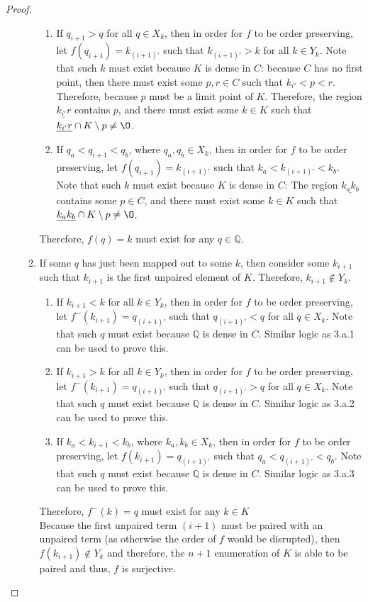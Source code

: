 \documentclass[openany, amssymb, psamsfonts]{amsart}
\newcommand{\bbQ}{\mathbb{Q}}
\renewcommand{\emptyset}{\O}
\newcommand{\sm}{\setminus}
\theoremstyle{definition}
\numberwithin{equation}{section}
\begin{document}
\begin{proof}
\begin{enumerate}
\begin{enumerate}
\begin{enumerate}
    \item If $q_{i+1}>q$ for all $q\in X_k$, then in order for $f$ to be order preserving, let $f(q_{i+1}) = k_{(i+1)'}$ such that $k_{(i+1)'} > k$ for all $k\in Y_k$. Note that such $k$ must exist because $K$ is dense in $C$: because $C$ has no first point, then there must exist some $p,r\in C$ such that $k_{i'}<p<r$. Therefore, because $p$ must be a limit point of $K$. Therefore, the region $\underline{k_{i'}r}$ contains $p$, and there must exist some $k\in K$ such that $\underline{k_{i'}r} \cap K\sm{p} \neq \emptyset$.
    \item If $q_a<q_{i+1}<q_b$, where $q_a,q_b\in X_k$, then in order for $f$ to be order preserving, let $f(q_{i+1}) = k_{(i+1)'}$ such that $k_a<k_{(i+1)'} <k_b$. Note that such $k$ must exist because $K$ is dense in $C$: The region $\underline{k_ak_b}$ contains some $p\in C$, and there must exist some $k\in K$ such that $\underline{k_ak_b} \cap K\sm{p} \neq \emptyset$.
    \end{enumerate}
    Therefore, $f(q) = k$ must exist for any $q\in \bbQ$. 
    \item If some $q$ has just been mapped out to some $k$, then consider some $k_{i+1}$ such that $k_{i+1}$ is the first unpaired element of $K$. Therefore, $k_{i+1}\notin Y_k$. 
    \begin{enumerate}
        \item If $k_{i+1}<k$ for all $k\in Y_k$, then in order for $f$ to be order preserving, let $f^-(k_{i+1}) = q_{(i+1)'}$ such that $q_{(i+1)'} < q$ for all $q\in X_k$. Note that such $q$ must exist because $\bbQ$ is dense in $C$. Similar logic as 3.a.1 can be used to prove this. 
        \item If $k_{i+1}>k$ for all $k\in Y_k$, then in order for $f$ to be order preserving, let $f^-(k_{i+1}) = q_{(i+1)'}$ such that $q_{(i+1)'} > q$ for all $q\in X_k$. Note that such $q$ must exist because $\bbQ$ is dense in $C$. Similar logic as 3.a.2 can be used to prove this.
        \item If $k_a<k_{i+1}<k_b$, where $k_a,k_b\in X_k$, then in order for $f$ to be order preserving, let $f(k_{i+1}) = q_{(i+1)'}$ such that $q_a<q_{(i+1)'} <q_b$. Note that such $q$ must exist because $\bbQ$ is dense in $C$. Similar logic as 3.a.3 can be used to prove this.
    \end{enumerate}
    Therefore, $f^-(k) = q$ must exist for any $k\in K$\\
    Because the first unpaired term $(i+1)$ must be paired with an unpaired term (as otherwise the order of $f$ would be disrupted), then $f(k_{i+1})\notin Y_k$ and therefore, the $n+1$ enumeration of $K$ is able to be paired and thus, $f$ is surjective. 

\end{enumerate}
\end{enumerate}
\end{proof}
\end{document}
